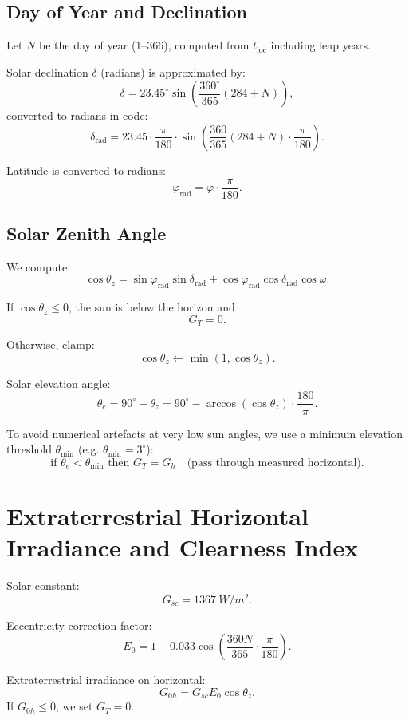 \documentclass[11pt,a4paper]{article}
\begin{document}
\subsection{Day of Year and Declination}

Let \(N\) be the day of year (1--366), computed from \(t_{\text{loc}}\) including leap years.

Solar declination \(\delta\) (radians) is approximated by:
\[
  \delta = 23.45^\circ \sin\left( \frac{360^\circ}{365} (284 + N) \right),
\]
converted to radians in code:
\[
  \delta_{\text{rad}} = 23.45 \cdot \frac{\pi}{180}
  \cdot
  \sin\left( \frac{360}{365} (284 + N) \cdot \frac{\pi}{180} \right).
\]

Latitude is converted to radians:
\[
  \varphi_{\text{rad}} = \varphi \cdot \frac{\pi}{180}.
\]

\subsection{Solar Zenith Angle}

We compute:
\[
  \cos\theta_z = \sin\varphi_{\text{rad}} \sin\delta_{\text{rad}}
  + \cos\varphi_{\text{rad}} \cos\delta_{\text{rad}} \cos\omega.
\]

If \(\cos\theta_z \le 0\), the sun is below the horizon and
\[
  G_T = 0.
\]

Otherwise, clamp:
\[
  \cos\theta_z \leftarrow \min(1, \cos\theta_z).
\]

Solar elevation angle:
\[
  \theta_e = 90^\circ - \theta_z = 90^\circ - \arccos(\cos\theta_z) \cdot \frac{180}{\pi}.
\]

To avoid numerical artefacts at very low sun angles, we use a minimum elevation threshold \(\theta_{\min}\) (e.g. \(\theta_{\min} = 3^\circ\)):
\[
  \text{if } \theta_e < \theta_{\min} \text{ then } G_T = G_h \quad\text{(pass through measured horizontal)}.
\]

\section{Extraterrestrial Horizontal Irradiance and Clearness Index}

Solar constant:
\[
  G_{sc} = 1367\ \si{W/m^2}.
\]

Eccentricity correction factor:
\[
  E_0 = 1 + 0.033 \cos\left( \frac{360 N}{365} \cdot \frac{\pi}{180} \right).
\]

Extraterrestrial irradiance on horizontal:
\[
  G_{0h} = G_{sc} E_0 \cos\theta_z.
\]
If \(G_{0h} \le 0\), we set \(G_T = 0\).
\end{document}
